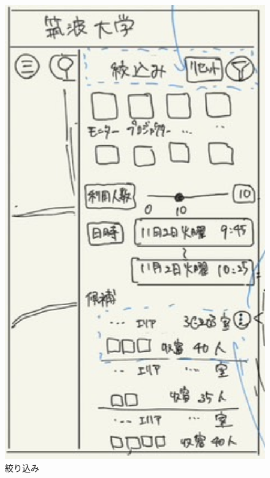 \documentclass[12pt,a4paper,dvipdf]{jsarticle}
\begin{document}
\begin{figure}[H]
\begin{minipage}[b]{0.24\columnwidth}
        \includegraphics[width=0.9\columnwidth]{./img/絞り込み.png}
        \caption{絞り込み}
    \end{minipage}
    \begin{minipage}[b]{0.24\columnwidth}
        \centering

\end{minipage}
\end{figure}
\end{document}
